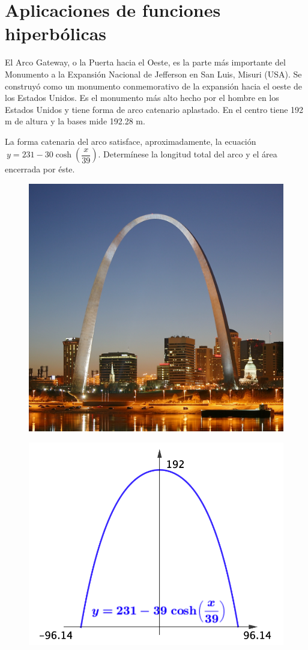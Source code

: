 \vspace{1cm}
\section{Aplicaciones de funciones hiperbólicas}
\vspace{0.5cm}

\begin{miejercicio}
	
	El Arco Gateway, o la Puerta hacia el Oeste, es la parte más importante del Monumento a la Expansión Nacional de Jefferson en San Luis, Misuri (USA). Se construyó como un monumento conmemorativo de la expansión hacia el oeste de los Estados Unidos. Es el monumento más alto hecho por el hombre en los Estados Unidos y tiene forma de arco catenario aplastado. En el centro tiene 192 m de altura y la bases mide 192.28 m.
	
	\vspace{2mm}La forma catenaria del arco satisface, aproximadamente, la ecuación $\ y=231-30\cosh \left( \dfrac x {39} \right)$.
	Determínese la longitud total del arco y el área encerrada por éste.
\end{miejercicio}


\vspace{3mm}
\begin{multicols}{2}
\begin{figure}[H]
	\centering
	\includegraphics[width=.4\textwidth]{img-hiperbol/hiperbol08.png}
	\end{figure}
\begin{figure}[H]
	\centering
	\includegraphics[width=.5\textwidth]{img-hiperbol/hiperbol09.png}
	\end{figure}	
\end{multicols}

